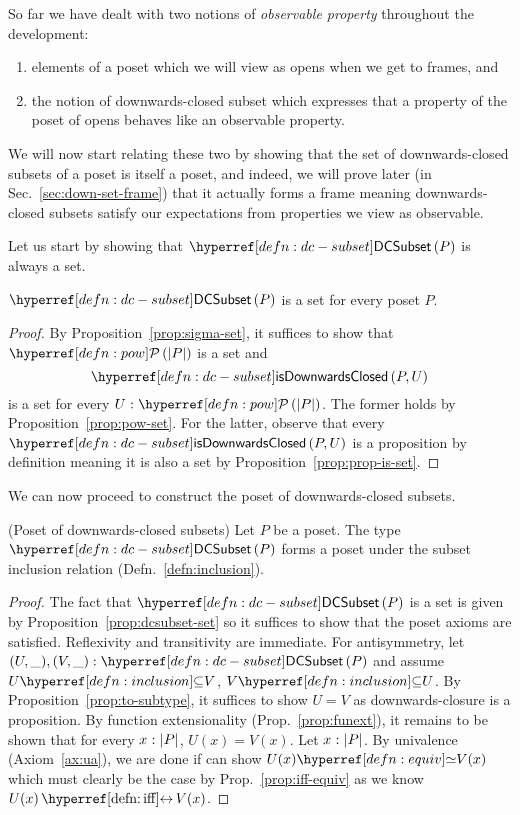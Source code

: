 So far we have dealt with two notions of \emph{observable property} throughout the
development:
\begin{enumerate}
  \item elements of a poset which we will view as opens when we get to frames, and
  \item the notion of downwards-closed subset which expresses that a property of the poset
    of opens behaves like an observable property.
\end{enumerate}
We will now start relating these two by showing that the set of downwards-closed subsets
of a poset is itself a poset, and indeed, we will prove later (in
Sec.~\ref{sec:down-set-frame}) that it actually forms a frame meaning downwards-closed
subsets satisfy our expectations from properties we view as observable.

Let us start by showing that $\dcsubset{P}$ is always a set.
\begin{prop}\label{prop:dcsubset-set}
  $\dcsubset{P}$ is a set for every poset $P$.
\end{prop}
\begin{proof}
  By Proposition~\ref{prop:sigma-set}, it suffices to show that $\pow{\abs{P}}$ is a set
  and $$\isdc{P, U}$$ is a set for every $\oftyI{U}{\pow{\abs{P}}}$. The former holds by
  Proposition~\ref{prop:pow-set}. For the latter, observe that every $\isdc{P, U}$ is a
  proposition by definition meaning it is also a set by
  Proposition~\ref{prop:prop-is-set}.
\end{proof}

We can now proceed to construct the poset of downwards-closed subsets.
\begin{prop}(Poset of downwards-closed subsets)\label{prop:dc-poset}
  Let $P$ be a poset. The type $\dcsubset{P}$ forms a poset under the
  subset inclusion relation (Defn.~\ref{defn:inclusion}).
\end{prop}
\begin{proof}
  The fact that $\dcsubset{P}$ is a set is given by Proposition~\ref{prop:dcsubset-set} so
  it suffices to show that the poset axioms are satisfied. Reflexivity and transitivity
  are immediate. For antisymmetry, let $\oftyII{(U, \_)}{(V, \_)}{\dcsubset{P}}$ and
  assume $\subsetof{U}{V}$, $\subsetof{V}{U}$. By Proposition~\ref{prop:to-subtype}, it
  suffices to show $U = V$ as downwards-closure is a proposition. By function
  extensionality (Prop.~\ref{prop:funext}), it remains to be shown that for every
  $x\hspace{0.1mm}:\hspace{0.1mm}\left| P \right|$, $U(x) = V(x)$. Let $x\hspace{0.1mm}:\hspace{0.1mm}\left| P \right|$. By univalence
  (Axiom~\ref{ax:ua}), we are done if can show $\typequiv{U(x)}{V(x)}$ which must clearly
  be the case by Prop.~\ref{prop:iff-equiv} as we know $\logequiv{U(x)}{V(x)}$.
\end{proof}


